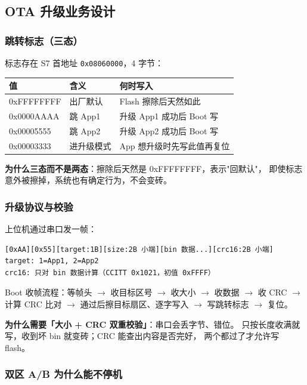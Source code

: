 \subsection{OTA 升级业务设计}

\subsubsection{跳转标志（三态）}

标志存在 S7 首地址 \texttt{0x08060000}，4 字节：

\begin{tabular}{lll}
\toprule
\textbf{值} & \textbf{含义} & \textbf{何时写入} \\
\midrule
0xFFFFFFFF & 出厂默认 & Flash 擦除后天然如此 \\
0x0000AAAA & 跳 App1 & 升级 App1 成功后 Boot 写 \\
0x00005555 & 跳 App2 & 升级 App2 成功后 Boot 写 \\
0x00003333 & 进升级模式 & App 想升级时先写此值再复位 \\
\bottomrule
\end{tabular}

\textbf{为什么三态而不是两态}：擦除后天然是 0xFFFFFFFF，表示"回默认"，
即使标志意外被擦掉，系统也有确定行为，不会变砖。

\subsubsection{升级协议与校验}

上位机通过串口发一帧：

\begin{lstlisting}[style=generic]
[0xAA][0x55][target:1B][size:2B 小端][bin 数据...][crc16:2B 小端]
target: 1=App1, 2=App2
crc16: 只对 bin 数据计算（CCITT 0x1021，初值 0xFFFF）
\end{lstlisting}

Boot 收帧流程：等帧头 $\to$ 收目标区号 $\to$ 收大小 $\to$ 收数据
$\to$ 收 CRC $\to$ 计算 CRC 比对 $\to$ 通过后擦目标扇区、逐字写入
$\to$ 写跳转标志 $\to$ 复位。

\textbf{为什么需要「大小 + CRC 双重校验」}：串口会丢字节、错位。
只按长度收满就写，收到坏 bin 就变砖；CRC 能查出内容是否完好，
两个都过了才允许写 flash。

\subsubsection{双区 A/B 为什么能不停机}

